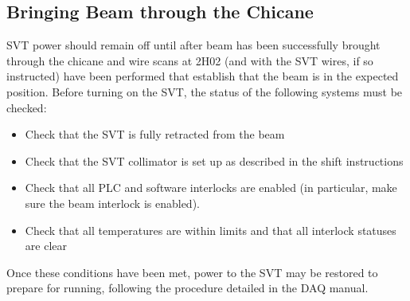 \documentclass[12pt]{report}
\begin{document}
\subsection{Bringing Beam through the Chicane}
SVT power should remain off until after beam has been successfully brought through the chicane and wire scans at 2H02 (and with the SVT wires, if so instructed) have been performed that establish that the beam is in the expected position. Before turning on the SVT, the status of the following systems must be checked:

\begin{itemize}
\item Check that the SVT is fully retracted from the beam
\item Check that the SVT collimator is set up as described in the shift instructions
\item Check that all PLC and software interlocks are enabled (in particular, make sure the beam interlock is enabled).
\item Check that all temperatures are within limits and that all interlock statuses are clear
\end{itemize}

Once these conditions have been met, power to the SVT may be restored to prepare for running, following the procedure detailed in the DAQ manual.

\end{document}
